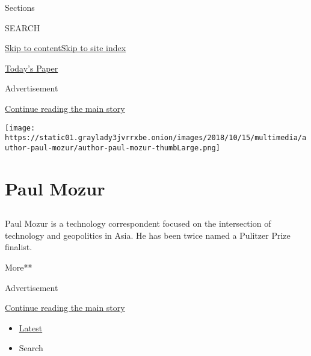 Sections

SEARCH

\protect\hyperlink{site-content}{Skip to
content}\protect\hyperlink{site-index}{Skip to site index}

\href{https://myaccount.nytimes3xbfgragh.onion/auth/login?response_type=cookie\&client_id=vi}{}

\href{https://www.nytimes3xbfgragh.onion/section/todayspaper}{Today's
Paper}

Advertisement

\protect\hyperlink{after-top}{Continue reading the main story}

\texttt{[image: https://static01.graylady3jvrrxbe.onion/images/2018/10/15/multimedia/author-paul-mozur/author-paul-mozur-thumbLarge.png]}

\hypertarget{paul-mozur}{%
\section{Paul Mozur}\label{paul-mozur}}

\hypertarget{section}{%
\subsection{}\label{section}}

Paul Mozur is a technology correspondent focused on the intersection of
technology and geopolitics in Asia. He has been twice named a Pulitzer
Prize finalist.

More**

Advertisement

\protect\hyperlink{after-mid1}{Continue reading the main story}

\begin{itemize}
\tightlist
\item
  \protect\hyperlink{stream-panel}{Latest}
\item
  Search
\end{itemize}

